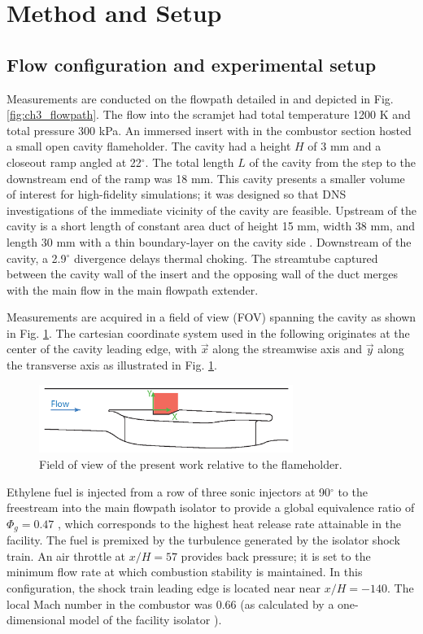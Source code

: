 \section*{Method and Setup}\label{sec:ch3_method_setup}

\subsection*{Flow configuration and experimental setup}
Measurements are conducted on the flowpath detailed in \cite{LieberGoyneRockwellEtAl2018a} and depicted in Fig. \ref{fig:ch3_flowpath}. The flow into the scramjet had total temperature 1200 K and total pressure 300 kPa. An immersed insert with in the combustor section hosted a small open cavity flameholder. The cavity had a height $H$ of 3 mm and a closeout ramp angled at 22$^\circ$. The total length $L$ of the cavity from the step to the downstream end of the ramp was 18 mm. This cavity presents a smaller volume of interest for high-fidelity simulations; it was designed so that DNS investigations of the immediate vicinity of the cavity are feasible.  Upstream of the cavity is a short length of constant area duct of height 15 mm, width 38 mm, and length 30 mm with a thin boundary-layer on the cavity side \citep{LieberThesis}. Downstream of the cavity, a 2.9$^\circ$ divergence delays thermal choking. The streamtube captured between the cavity wall of the insert and the opposing wall of the duct merges with the main flow in the main flowpath extender. 

Measurements are acquired in a field of view (FOV) spanning the cavity as shown in Fig. \ref{fig:ch3_FOVs}. The cartesian coordinate system used in the following originates at the center of the cavity leading edge, with $\vec{x}$ along the streamwise axis and $\vec{y}$ along the transverse axis as illustrated in Fig. \ref{fig:ch3_FOVs}.

\begin{figure}[!hbt]
\centering
\includegraphics[width=3.25in, trim=0.3in 0in 0.57in 0in, clip]{figures/FOVs/aaArtboard2.png} %
\caption{Field of view of the present work relative to the flameholder.}\label{fig:ch3_FOVs}
\end{figure}

Ethylene fuel is injected from a row of three sonic injectors at 90$^\circ$ to the freestream into the main flowpath isolator to provide a global equivalence ratio of $\Phi_g=0.47$  \cite{RockwellGoyneChelliahEtAl2017}, which corresponds to the highest heat release rate attainable in the facility. The fuel is premixed by the turbulence generated by the isolator shock train. An air throttle at $x/H=57$ provides back pressure; it is set to the minimum flow rate at which combustion stability is maintained. In this configuration, the shock train leading edge is located near near $x/H=-140$. The local Mach number in the combustor was 0.66 (as calculated by a one-dimensional model of the facility isolator \cite{HeiserPrattDaleyEtAl1994}).

